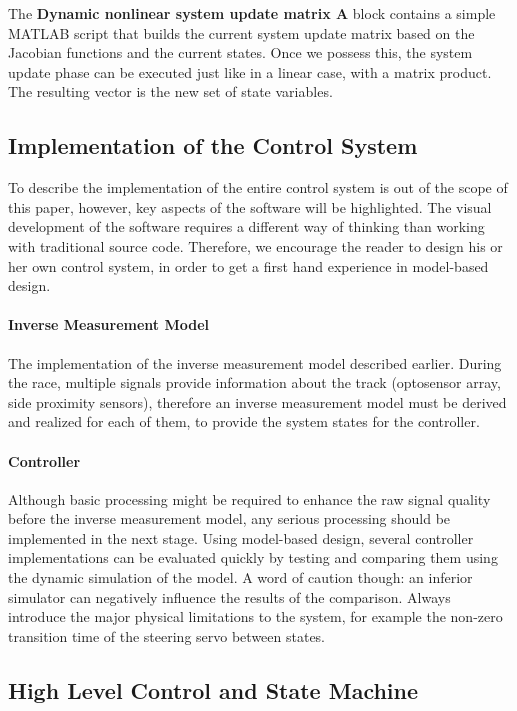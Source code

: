 The \textbf{Dynamic nonlinear system update matrix A} block contains a simple MATLAB script that builds the current system update matrix based on the Jacobian functions and the current states. Once we possess this, the system update phase can be executed just like in a linear case, with a matrix product. The resulting vector is the new set of state variables.

\subsection{Implementation of the Control System}

To describe the implementation of the entire control system is out of the scope of this paper, however, key aspects of the software will be highlighted. The visual development of the software requires a different way of thinking than working with traditional source code. Therefore, we encourage the reader to design his or her own control system, in order to get a first hand experience in model-based design.

\paragraph{Inverse Measurement Model}

The implementation of the inverse measurement model described earlier. During the race, multiple signals provide information about the track (optosensor array, side proximity sensors), therefore an inverse measurement model must be derived and realized for each of them, to provide the system states for the controller.

\paragraph{Controller}

Although basic processing might be required to enhance the raw signal quality before the inverse measurement model, any serious processing should be implemented in the next stage. Using model-based design, several controller implementations can be evaluated quickly by testing and comparing them using the dynamic simulation of the model. A word of caution though: an inferior simulator can negatively influence the results of the comparison. Always introduce the major physical limitations to the system, for example the non-zero transition time of the steering servo between states.

\subsection{High Level Control and State Machine}


